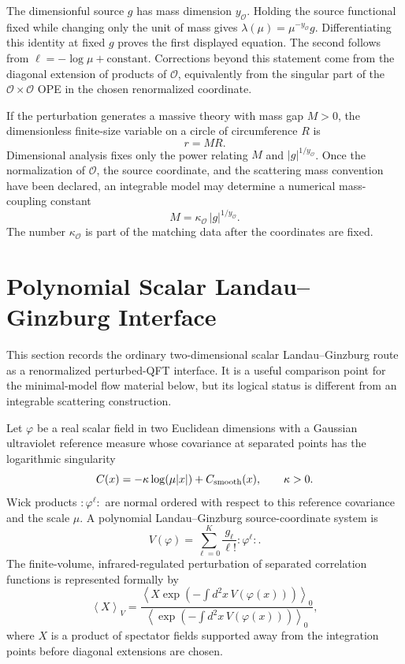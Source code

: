 The dimensionful source \(g\) has mass dimension \(y_{\mathcal O}\).  Holding
the source functional fixed while changing only the unit of mass gives
\(\lambda(\mu)=\mu^{-y_{\mathcal O}}g\).  Differentiating this identity at
fixed \(g\) proves the first displayed equation.  The second follows from
\(\ell=-\log\mu+\mathrm{constant}\).  Corrections beyond this statement come
from the diagonal extension of products of \(\mathcal O\), equivalently from
the singular part of the \(\mathcal O\times\mathcal O\) OPE in the chosen
renormalized coordinate.

If the perturbation generates a massive theory with mass gap \(M>0\), the
dimensionless finite-size variable on a circle of circumference \(R\) is
\[
  r=MR .
\]
Dimensional analysis fixes only the power relating \(M\) and
\(|g|^{1/y_{\mathcal O}}\).  Once the normalization of \(\mathcal O\), the
source coordinate, and the scattering mass convention have been declared, an
integrable model may determine a numerical mass-coupling constant
\[
  M=\kappa_{\mathcal O}\,|g|^{1/y_{\mathcal O}} .
\]
The number \(\kappa_{\mathcal O}\) is part of the matching data after the
coordinates are fixed.

\section{Polynomial Scalar Landau--Ginzburg Interface}
\label{sec:polynomial-scalar-lg-minimal-interface}

This section records the ordinary two-dimensional scalar
Landau--Ginzburg route as a renormalized perturbed-QFT interface.  It is a
useful comparison point for the minimal-model flow material below, but its
logical status is different from an integrable scattering construction.

Let \(\varphi\) be a real scalar field in two Euclidean dimensions with a
Gaussian ultraviolet reference measure whose covariance at separated points
has the logarithmic singularity
\begin{equation}
  C(x)=-\kappa\log(\mu |x|)+C_{\rm smooth}(x),
  \qquad \kappa>0 .
  \label{eq:scalar-lg-log-covariance}
\end{equation}
Wick products \(:\!\varphi^\ell\!:\) are normal ordered with respect to this
reference covariance and the scale \(\mu\).  A polynomial
Landau--Ginzburg source-coordinate system is
\begin{equation}
  V(\varphi)=\sum_{\ell=0}^{K}\frac{g_\ell}{\ell!}:\!\varphi^\ell\!: .
  \label{eq:scalar-polynomial-lg-potential}
\end{equation}
The finite-volume, infrared-regulated perturbation of separated correlation
functions is represented formally by
\begin{equation}
  \left\langle X\right\rangle_V
  =
  \frac{
  \left\langle
  X\exp\!\left(-\int d^2x\,V(\varphi(x))\right)
  \right\rangle_0}
  {\left\langle
  \exp\!\left(-\int d^2x\,V(\varphi(x))\right)
  \right\rangle_0},
  \label{eq:scalar-lg-normal-ordered-perturbation}
\end{equation}
where \(X\) is a product of spectator fields supported away from the
integration points before diagonal extensions are chosen.

